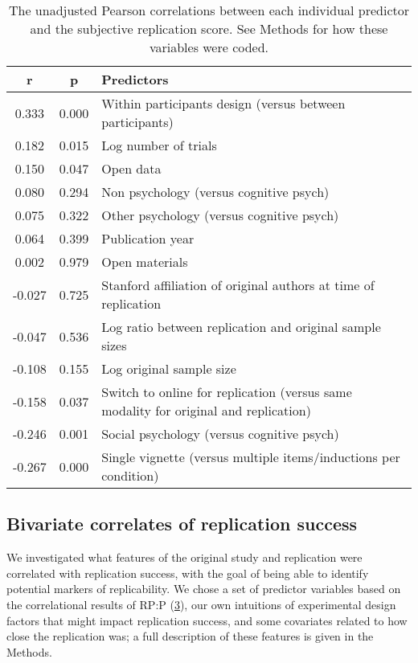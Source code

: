 \documentclass[
  english,
  a4paper,
]{article}
\begin{document}
\begin{table}[!h]

\caption{\label{tab:cor}The unadjusted Pearson correlations between each individual predictor and the subjective replication score. See Methods for how these variables were coded.}
\centering
\fontsize{10}{12}\selectfont
\begin{tabular}[t]{ccl}
\toprule
r & p & Predictors\\
\midrule
0.333 & 0.000 & Within participants design (versus between participants)\\
0.182 & 0.015 & Log number of  trials\\
0.150 & 0.047 & Open data\\
0.080 & 0.294 & Non psychology (versus cognitive psych)\\
0.075 & 0.322 & Other psychology (versus cognitive psych)\\
0.064 & 0.399 & Publication year\\
0.002 & 0.979 & Open materials\\
-0.027 & 0.725 & Stanford affiliation of original authors at time of replication\\
-0.047 & 0.536 & Log ratio between replication and original sample sizes\\
-0.108 & 0.155 & Log original sample size\\
-0.158 & 0.037 & Switch to online for replication (versus same modality for original and replication)\\
-0.246 & 0.001 & Social psychology (versus cognitive psych)\\
-0.267 & 0.000 & Single vignette (versus multiple items/inductions per condition)\\
\bottomrule
\end{tabular}
\end{table}

\hypertarget{bivariate-correlates-of-replication-success}{%
\subsection{Bivariate correlates of replication success}\label{bivariate-correlates-of-replication-success}}

We investigated what features of the original study and replication were correlated with replication success, with the goal of being able to identify potential markers of replicability. We chose a set of predictor variables based on the correlational results of RP:P (\protect\hyperlink{ref-openscienceconsortium2015}{3}), our own intuitions of experimental design factors that might impact replication success, and some covariates related to how close the replication was; a full description of these features is given in the Methods.
\end{document}
